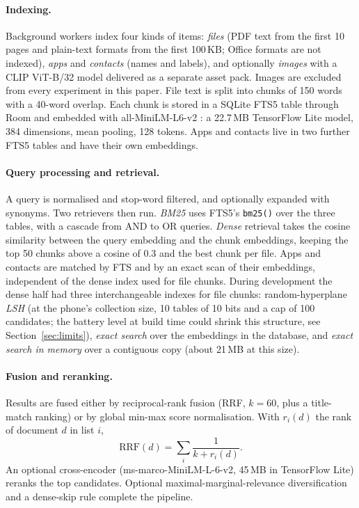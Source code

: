 \documentclass[11pt,a4paper]{article}
\begin{document}
\paragraph{Indexing.} Background workers index four kinds of items: \emph{files} (PDF text from the first 10 pages and plain-text formats from the first 100\,KB; Office formats are not indexed), \emph{apps} and \emph{contacts} (names and labels), and optionally \emph{images} with a CLIP ViT-B/32 model delivered as a separate asset pack. Images are excluded from every experiment in this paper. File text is split into chunks of 150 words with a 40-word overlap. Each chunk is stored in a SQLite FTS5 table through Room and embedded with all-MiniLM-L6-v2 \citep{wang2020minilm}: a 22.7\,MB TensorFlow Lite model, 384 dimensions, mean pooling, 128 tokens. Apps and contacts live in two further FTS5 tables and have their own embeddings.

\paragraph{Query processing and retrieval.} A query is normalised and stop-word filtered, and optionally expanded with synonyms. Two retrievers then run. \emph{BM25} uses FTS5's \texttt{bm25()} over the three tables, with a cascade from AND to OR queries. \emph{Dense} retrieval takes the cosine similarity between the query embedding and the chunk embeddings, keeping the top 50 chunks above a cosine of 0.3 and the best chunk per file. Apps and contacts are matched by FTS and by an exact scan of their embeddings, independent of the dense index used for file chunks. During development the dense half had three interchangeable indexes for file chunks: random-hyperplane \emph{LSH} (at the phone's collection size, 10 tables of 10 bits and a cap of 100 candidates; the battery level at build time could shrink this structure, see Section~\ref{sec:limits}), \emph{exact search} over the embeddings in the database, and \emph{exact search in memory} over a contiguous copy (about 21\,MB at this size).

\paragraph{Fusion and reranking.} Results are fused either by reciprocal-rank fusion (RRF, $k=60$, plus a title-match ranking) or by global min-max score normalisation. With $r_i(d)$ the rank of document $d$ in list $i$,
\begin{equation}
\mathrm{RRF}(d) = \sum_{i} \frac{1}{k + r_i(d)}.
\end{equation}
An optional cross-encoder (ms-marco-MiniLM-L-6-v2, 45\,MB in TensorFlow Lite) reranks the top candidates. Optional maximal-marginal-relevance diversification and a dense-skip rule complete the pipeline.
\end{document}
